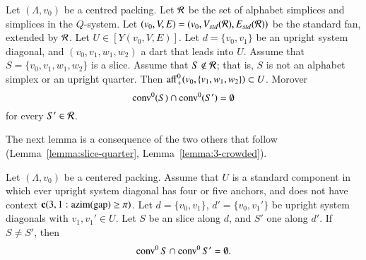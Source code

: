 \begin{lemma}  Let $(\Lambda,v_0)$ be a centred packing.  
Let ${\mathcal R}$ be the set of alphabet simplices and simplices in the $Q$-system.
Let $(v_0,V,E)=(v_0,V_{std}({\mathcal R}),E_{std}({\mathcal R}))$ be the standard fan, extended
by ${\mathcal R}$.  Let $U\in[Y(v_0,V,E)]$.
Let $d = \{v_0,v_1\}$ be an upright system diagonal, and $(v_0,v_1,w_1,w_2)$
a dart that leads into $U$.  Assume that $S=\{v_0,v_1,w_1,w_2\}$ is a slice.
Assume that $S\not\in{\mathcal R}$; that is, $S$ is not an alphabet simplex or
an upright quarter.  Then ${\operatorname{aff}}_+^0(v_0,\{v_1,w_1,w_2\})\subset U$.
Morover $${\operatorname{conv}}^0(S) \cap {\operatorname{conv}}^0(S') =\emptyset$$
for every $S'\in {\mathcal R}$.
\end{lemma}





The next lemma is a consequence of the two others that follow
(Lemma~\ref{lemma:slice-quarter}, Lemma~\ref{lemma:3-crowded}).




\begin{lemma}
Let $(\Lambda,v_0)$ be a centered packing.  Assume that $U$ is a
standard component in which ever upright system diagonal has four
or five anchors, and does not have context ${\operatorname{\bf c}}{(3,1: {\operatorname{azim}}({\operatorname{gap}}) \ge \pi)}$.  Let
$d = \{v_0,v_1\}$, $d'=\{v_0,v_1'\}$ be upright system diagonals
with $v_1,v_1'\in U$.
Let $S$ be an slice along $d$, and $S'$ one along $d'$.
If $S\ne S'$, then 
$${\operatorname{conv}}^0\,S \cap {\operatorname{conv}}^0\,S' = \emptyset.$$
\end{lemma}

